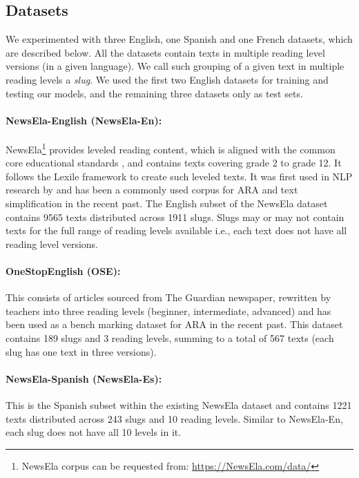\documentclass[11pt]{article}
\begin{document}
\subsection{Datasets}
We experimented with three English, one Spanish and one French datasets, which are described below. All the datasets contain texts in multiple reading level versions (in a given language). We call such grouping of a given text in multiple reading levels a \textit{slug}. We used the first two English datasets for training and testing our models, and the remaining three datasets only as test sets.

\paragraph{NewsEla-English (NewsEla-En):} NewsEla\footnote{NewsEla corpus can be requested from: \url{https://NewsEla.com/data/}} provides leveled reading content, which is aligned with the common core educational standards \cite{Porter.McMaken.ea-11}, and contains texts covering grade 2 to grade 12. It follows the Lexile \cite{Stenner-96} framework to create such leveled texts. It was first used in NLP research by  and has been a commonly used corpus for ARA and text simplification in the recent past. The English subset of the NewsEla dataset contains 9565 texts distributed across 1911 slugs. Slugs may or may not contain texts for the full range of reading levels available i.e., each text does not have all reading level versions.

\paragraph{OneStopEnglish (OSE): } This consists of articles sourced from The Guardian newspaper, rewritten by teachers into three reading levels (beginner, intermediate, advanced) \cite{Vajjala.Lucic-18} and has been used as a bench marking dataset for ARA in the recent past. This dataset contains 189 slugs and 3 reading levels, summing to a total of 567 texts (each slug has one text in three versions).

\paragraph{NewsEla-Spanish (NewsEla-Es): } This is the Spanish subset within the existing NewsEla dataset and contains 1221 texts distributed across 243 slugs and 10 reading levels. Similar to NewsEla-En, each slug does not have all 10 levels in it. 
\end{document}
